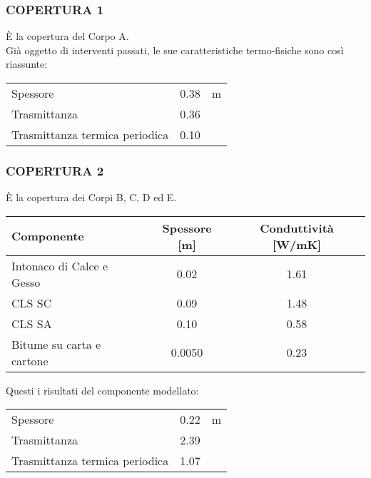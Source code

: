 \subsubsection{COPERTURA 1}
È la copertura del Corpo A.\\Già oggetto di interventi passati, le sue caratteristiche termo-fisiche sono così riassunte:
\begin{center}
	\begin{tabular}{lcc}
		\toprule
		Spessore & \num{0.38} & \si{m}\\
		Trasmittanza & \num{0.36} & \trasm\\
		Trasmittanza termica periodica & \num{0.10} & \trasm\\
		\bottomrule
	\end{tabular}
\end{center}
\subsubsection{COPERTURA 2}
È la copertura dei Corpi B, C, D ed E.
\begin{center}
	\begin{tabular}{lcc}
		\toprule
		Componente & Spessore [m] & Conduttività [\si{W/mK}] \\
		\midrule
		Intonaco di Calce e Gesso & \num{0.02} & \num{1.61} \\
		CLS SC  & \num{0.09} & \num{1.48}\\
		CLS SA & \num{0.10} & \num{0.58} \\
		Bitume su carta e cartone & \num{0.0050} & \num{0.23} \\
		\bottomrule
	\end{tabular}
\end{center}
Questi i risultati del componente modellato:
\begin{center}
	\begin{tabular}{lcc}
		\toprule
		Spessore & \num{0.22} & \si{m}\\
		Trasmittanza & \num{2.39} & \trasm\\
		Trasmittanza termica periodica & \num{1.07} & \trasm\\
		\bottomrule
	\end{tabular}
\end{center}
